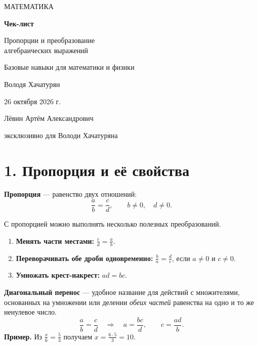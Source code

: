 \documentclass[a4paper,12pt]{article}
\newcommand{\lead}[1]{\textcolor{darkaccent}{\textbf{#1}}}
\newcommand{\sect}[1]{\section*{#1}\vspace{-3mm}}
\begin{document}
\thispagestyle{empty}
\begin{center}
\vspace*{24mm}
{\color{darkaccent}\Large МАТЕМАТИКА\par}
\vspace{23mm}
{\Huge\bfseries Чек-лист\par}
\vspace{15mm}
{\LARGE\color{accent} Пропорции и преобразование\\[3pt] алгебраических выражений\par}
\vspace{16mm}
{\large Базовые навыки для математики и физики\par}
\vfill
{\Large Володя Хачатурян\par}
\vspace{12mm}
{\large 26 октября 2026 г.\par}
\vspace{19mm}
{\normalsize Лёвин Артём Александрович\par}
{\small эксклюзивно для Володи Хачатуряна\par}
\vspace{18mm}
\vspace*{2mm}
\end{center}
\clearpage

\sect{1. Пропорция и её свойства}
\lead{Пропорция} --- равенство двух отношений:
\[
\frac{a}{b}=\frac{c}{d},\qquad b\ne0,\quad d\ne0.
\]

С пропорцией можно выполнять несколько полезных преобразований.
\begin{enumerate}[label=\arabic*.]
\item \textbf{Менять части местами:} $\displaystyle\frac{c}{d}=\frac{a}{b}$.
\item \textbf{Переворачивать обе дроби одновременно:}
$\displaystyle\frac{b}{a}=\frac{d}{c}$, если $a\ne0$ и $c\ne0$.
\item \textbf{Умножать крест-накрест:}
$\displaystyle ad=bc$.
\end{enumerate}
\lead{Диагональный перенос} --- удобное название для действий с множителями, основанных на умножении или делении \emph{обеих частей} равенства на одно и то же ненулевое число.
\[
\frac{a}{b}=\frac{c}{d}
\quad\Longrightarrow\quad
 a=\frac{bc}{d},\qquad
 c=\frac{ad}{b}.
\]
\textbf{Пример.} Из $\displaystyle\frac{x}{6}=\frac{5}{3}$ получаем
$\displaystyle x=\frac{6\cdot5}{3}=10$.
\end{document}
